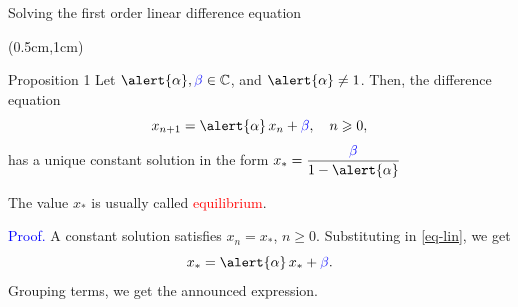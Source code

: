 \documentclass[10pt,t]{beamer}
\begin{document}
	\begin{frame}{Solving the first order linear difference equation}
	
	\transwipe
	
	\begin{textblock*}{12cm}(0.5cm,1cm)
	
	\begin{block}{Proposition 1} Let $\alert{\alpha}, \textcolor{blue}{\beta} \in \mathbb{C}$, and $\alert{\alpha} \neq 1$. Then, the difference equation
	\begin{equation}\label{eq-lin}
	x_{n+1} = \alert{\alpha} \,x_n + \textcolor{blue}{\beta}, \quad n\geqslant 0,
	\end{equation}
	has a unique constant solution in the form $\displaystyle{x_{*} = \frac{\textcolor{blue}{\beta}}{1-\alert{\alpha}}}$
	\end{block}
	
	\end{textblock*}
	
	\vspace{4cm}
	
	The value $x_*$ is usually called \textcolor{red}{equilibrium}.
	
	\vspace{1cm}
	
	\textcolor{blue}{Proof.} A constant solution satisfies $x_n = x_*$, $n\geqslant0$. Substituting in \eqref{eq-lin}, we get
	$$
	x_{*} = \alert{\alpha} \,x_* + \textcolor{blue}{\beta}.
	$$
	Grouping terms, we get the announced expression.
	\end{frame}
	
	
\end{document}
